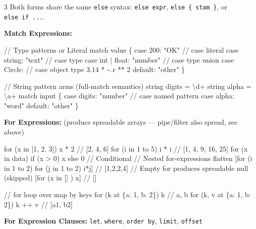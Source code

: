 \documentclass[8pt,landscape,a4paper,oneside]{article}
\newenvironment{Shaded}{%
  \begin{snugshade}%
  \vspace{0.4\baselineskip}%
  \fontsize{9}{10}\selectfont%
  \setlength{\parskip}{0pt}%
  \setlength{\topsep}{0pt}%
  \setlength{\partopsep}{0pt}%
}{%
  \vspace{0.01\baselineskip}%
  \end{snugshade}%
}
\newcommand{\NormalTok}[1]{#1}
\begin{document}
\begin{multicols*}{3}
Both forms share the same \texttt{else} syntax: \texttt{else\ expr},
\texttt{else\ \{\ stam\ \}}, or \texttt{else\ if\ ...}.

\textbf{Match Expressions:}

\begin{Shaded}
\begin{Highlighting}[]
\NormalTok{// Type patterns or Literal}
\NormalTok{match value \{}
\NormalTok{    case 200: "OK"              // case literal}
\NormalTok{    case string: "text"         // case type}
\NormalTok{    case int | float: "number"  // case type union}
\NormalTok{    case Circle:                // case object type}
\NormalTok{        3.14 * \textasciitilde{}.r ** 2}
\NormalTok{    default: "other"}
\NormalTok{\}}

\NormalTok{// String pattern arms (full{-}match semantics)}
\NormalTok{string digits = \textbackslash{}d+}
\NormalTok{string alpha = \textbackslash{}a+}
\NormalTok{match input \{}
\NormalTok{    case digits: "number"     // case named pattern}
\NormalTok{    case alpha: "word"}
\NormalTok{    default: "other"}
\NormalTok{\}}
\end{Highlighting}
\end{Shaded}

\textbf{For Expressions:} (produce spreadable arrays --- pipe/filter
also spread, see above)

\begin{Shaded}
\begin{Highlighting}[]
\NormalTok{for (x in [1, 2, 3]) x * 2     // [2, 4, 6]}
\NormalTok{for (i in 1 to 5) i * i        // [1, 4, 9, 16, 25]}
\NormalTok{for (x in data) if (x \textgreater{} 0) x else 0  // Conditional}
\NormalTok{// Nested for{-}expressions flatten}
\NormalTok{[for (i in 1 to 2) for (j in 1 to 2) i*j]  // [1,2,2,4]}
\NormalTok{// Empty for produces spreadable null (skipped)}
\NormalTok{[for (x in [] ) x]             // []}

\NormalTok{// for loop over map by keys}
\NormalTok{for (k at \{a: 1, b: 2\}) k      // \textquotesingle{}a\textquotesingle{}, \textquotesingle{}b\textquotesingle{}}
\NormalTok{for (k, v at \{a: 1, b: 2\}) k ++ v  // [\textquotesingle{}a1\textquotesingle{}, \textquotesingle{}b2\textquotesingle{}]}
\end{Highlighting}
\end{Shaded}

\textbf{For Expression Clauses:} \texttt{let}, \texttt{where},
\texttt{order\ by}, \texttt{limit}, \texttt{offset}


\end{multicols*}
\end{document}
